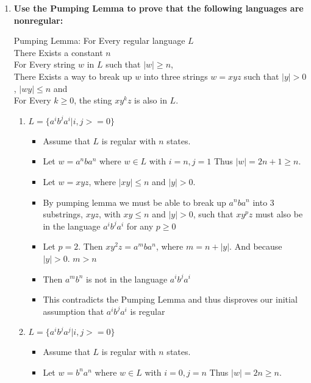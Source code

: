 

\begin{enumerate}

\item \textbf{Use the Pumping Lemma to prove that the following languages are nonregular:}

Pumping Lemma:
For Every regular language $L$\\
There Exists a constant $n$\\
For Every  string $w$ in $L$ such that $|w| \geq n$,\\
There Exists a way to break up $w$ into three strings $w=xyz$ such that $|y|>0$, $|wy| \leq n$ and \\
For Every $k \geq 0$, the sting $xy^kz$ is also in  $L$.\\
\begin{enumerate}
	\item $L = \{a^ib^j a^i | i , j >=0\}$
	
	\begin{itemize}
		\item 	Assume that $L$ is regular with $n$ states.  	
		\item Let $w = a^nba^n$ where $w \in L$ with $i=n, j=1$ Thus $|w| = 2n + 1 \geq n$.
		
		\item Let $w = xyz$, where $|xy| \leq n$ and $|y| > 0$.
		
		\item By pumping lemma we must be able to break up $a^nba^n$ into 3 substrings, $xyz$, with $xy \leq n$ and $|y| > 0$, such that $xy^pz$ must also be in the language $a^ib^ja^i$ for any $p \geq 0$
		
		\item Let $p = 2$. Then $xy^2z = a^mba^n$, where $m = n + |y|$.  And because $|y| > 0$. $m>n$
		
		\item Then $a^mb^n$ is not in the language $a^ib^ja^i$
		
		\item This contradicts the Pumping Lemma and thus disproves our initial assumption that $a^ib^ja^i$ is regular
	
	\end{itemize}

	\item $L = \{a^ib^ja^j | i , j >=0\}$ 
		\begin{itemize}
		\item 	Assume that $L$ is regular with $n$ states.  	
		\item Let $w = b^na^n$ where $w \in L$ with $i=0, j=n$ Thus $|w| = 2n  \geq n$.
		

\end{itemize}
\end{enumerate}
\end{enumerate}
